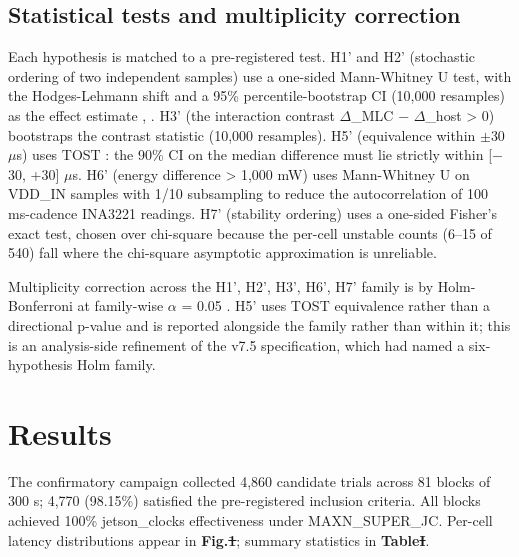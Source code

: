 \documentclass{IEEE_lsens}
\providecommand{\DIFadd}[1]{{\protect\color{blue}\uwave{#1}}} %
\providecommand{\DIFdel}[1]{{\protect\color{red}\sout{#1}}}                      %
\providecommand{\DIFaddbegin}{} %
\providecommand{\DIFaddend}{} %
\providecommand{\DIFdelbegin}{} %
\providecommand{\DIFdelend}{} %
\newcommand{\DIFscaledelfig}{0.5}
\newlength{\DIFdelgraphicswidth} %
\newlength{\DIFdelgraphicsheight} %
\newcommand{\DIFaddincludegraphics}[2][]{{\color{blue}\fbox{\DIFOincludegraphics[#1]{#2}}}} %
\newcommand{\DIFdelincludegraphics}[2][]{%
\sbox{\DIFdelgraphicsbox}{\DIFOincludegraphics[#1]{#2}}%
\settoboxwidth{\DIFdelgraphicswidth}{\DIFdelgraphicsbox} %
\settoboxtotalheight{\DIFdelgraphicsheight}{\DIFdelgraphicsbox} %
\scalebox{\DIFscaledelfig}{%
\parbox[b]{\DIFdelgraphicswidth}{\usebox{\DIFdelgraphicsbox}\\[-\baselineskip] \rule{\DIFdelgraphicswidth}{0em}}\llap{\resizebox{\DIFdelgraphicswidth}{\DIFdelgraphicsheight}{%
\setlength{\unitlength}{\DIFdelgraphicswidth}%
\begin{picture}(1,1)%
\thicklines\linethickness{2pt} %
{\color[rgb]{1,0,0}\put(0,0){\framebox(1,1){}}}%
{\color[rgb]{1,0,0}\put(0,0){\line( 1,1){1}}}%
{\color[rgb]{1,0,0}\put(0,1){\line(1,-1){1}}}%
\end{picture}%
}\hspace*{3pt}}} %
} %
\DeclareRobustCommand{\DIFaddbegin}{\DIFOaddbegin \let\includegraphics\DIFaddincludegraphics} %
\DeclareRobustCommand{\DIFaddend}{\DIFOaddend \let\includegraphics\DIFOincludegraphics} %
\DeclareRobustCommand{\DIFdelbegin}{\DIFOdelbegin \let\includegraphics\DIFdelincludegraphics} %
\DeclareRobustCommand{\DIFdelend}{\DIFOaddend \let\includegraphics\DIFOincludegraphics} %
\begin{document}
\subsection{Statistical tests and multiplicity correction}

Each hypothesis is matched to a pre-registered test. H1' and H2' (stochastic ordering of two independent samples) use a one-sided Mann-Whitney U test, with the Hodges-Lehmann shift and a 95\% percentile-bootstrap CI (10,000 resamples) as the effect estimate \cite{ref5}, \cite{ref6}. H3' (the interaction contrast $\Delta$\_MLC $-$ $\Delta$\_host \textgreater{} 0) bootstraps the contrast statistic (10,000 resamples). H5' (equivalence within $\pm$30 $\mu$s) uses TOST \cite{ref7}: the 90\% CI on the median difference must lie strictly within [$-$30, +30] $\mu$s. H6' (energy difference \textgreater{} 1,000 mW) uses Mann-Whitney U on VDD\_IN samples with 1/10 subsampling to reduce the autocorrelation of 100 ms-cadence INA3221 readings. H7' (stability ordering) uses a one-sided Fisher's exact test, chosen over chi-square because the per-cell unstable counts (6--15 of 540) fall where the chi-square asymptotic approximation is unreliable.

Multiplicity correction across the {H1', H2', H3', H6', H7'} family is by Holm-Bonferroni at family-wise $\alpha$ = 0.05 \cite{ref8}. H5' uses TOST equivalence rather than a directional p-value and is reported alongside the family rather than within it; this is an analysis-side refinement of the v7.5 specification, which had named a six-hypothesis Holm family.


\section{Results}

The confirmatory campaign collected 4,860 candidate trials across 81 blocks of 300 s; 4,770 (98.15\%) satisfied the pre-registered inclusion criteria. All blocks achieved 100\% jetson\_clocks effectiveness under MAXN\_SUPER\_JC. Per-cell latency distributions appear in \textbf{Fig.\DIFdelbegin \DIFdel{1}\DIFdelend \DIFaddbegin \DIFadd{~\ref{fig:latency}}\DIFaddend }; summary statistics in \textbf{Table\DIFdelbegin \DIFdel{I}\DIFdelend \DIFaddbegin \DIFadd{~\ref{tab:latency}}\DIFaddend }.
\end{document}
